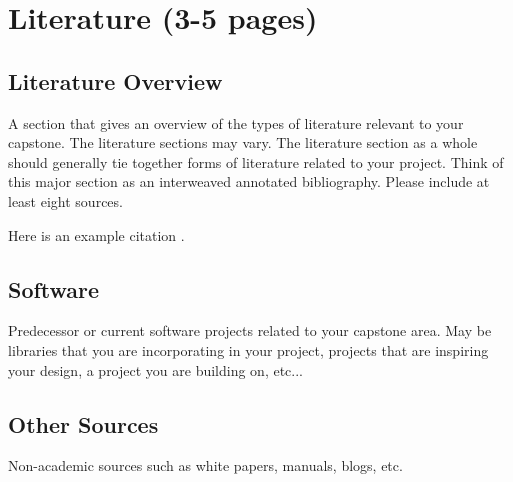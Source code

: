 \chapter{Literature (3-5 pages)}
\label{ch:Literature}



\section{Literature Overview}

A section that gives an overview of the types of literature relevant to your capstone. The literature sections may vary. The literature section as a whole should generally tie together forms of literature related to your project. Think of this major section as an interweaved annotated bibliography. Please include at least eight sources.

Here is an example citation \cite{Doe2017}.




\section{Software}

Predecessor or current software projects related to your capstone area. May be libraries that you are incorporating in your project, projects that are inspiring your design, a project you are building on, etc...




\section{Other Sources}

Non-academic sources such as white papers, manuals, blogs, etc.

